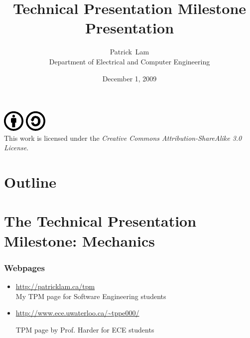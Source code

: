 \documentclass{beamer}
\title{Technical Presentation Milestone Presentation}
\author{Patrick~Lam\\Department of Electrical and Computer Engineering}
\date{December 1, 2009}
\begin{document}
\newcommand{\CcNote}[1]{%
	This work is licensed under the \textit{Creative Commons #1 3.0 License}.%
}
\newcommand{\CcImageBy}[1]{%
	\includegraphics[scale=#1]{creative_commons/cc_by_30.pdf}%
}
\newcommand{\CcImageSa}[1]{%
	\includegraphics[scale=#1]{creative_commons/cc_sa_30.pdf}%
}
\newcommand{\CcGroupBySa}[2]{%
	\CcImageBy{#1}\hspace*{#2}\CcImageSa{#1}%
}
\newcommand{\CcLongnameBySa}{Attribution-ShareAlike}

\begin{frame}
  \titlepage

  \vfill
  \begin{center}
    \CcGroupBySa{0.83}{0.95ex}\\
		  {\tiny\CcNote{\CcLongnameBySa}}
		  \vspace*{-2.5ex}
  \end{center}

\end{frame}

\section*{Outline}
\begin{frame}
  \tableofcontents
\end{frame}

\section[TPM]{The Technical Presentation Milestone: Mechanics}

\begin{frame}
\frametitle{Webpages}

\begin{itemize}
\item[] {\large
\url{http://patricklam.ca/tpm}
}\\
My TPM page for Software Engineering students\\[2em]

\item[] {\large 
\url{http://www.ece.uwaterloo.ca/~tppe000/}
}

TPM page by Prof. Harder for ECE students
\end{itemize}

\end{frame}
\end{document}
